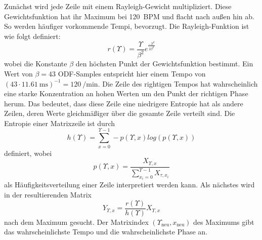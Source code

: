 {{{			%
			Zunächst wird jede Zeile mit einem Rayleigh-Gewicht multipliziert.
			Diese Gewichtsfunktion hat ihr Maximum bei \SI{120}{BPM} und flacht nach außen hin ab.
			So werden häufiger vorkommende Tempi, bevorzugt.
			Die Rayleigh-Funktion ist wie folgt definiert:
			\begin{equation}
				r(\Upsilon) = \frac{\Upsilon}{\beta^2}e^{\frac{-\Upsilon^2}{2\beta^2}}
			\end{equation}
			wobei die Konstante $\beta$ den höchsten Punkt der Gewichtsfunktion bestimmt.
			Ein Wert von $\beta = 43$ ODF-Samples entspricht hier einem Tempo von
				$(43 \cdot \SI{11.61}{\milli\second})^{-1} = \SI{120}{\per\minute}$.
			Die Zeile des rightigen Tempos hat wahrscheinlich eine starke Konzentration an hohen Werten um den Punkt der richtigen Phase herum.
			Das bedeutet,
				dass diese Zeile eine niedrigere Entropie hat als andere Zeilen,
				deren Werte gleichmäßiger über die gesamte Zeile verteilt sind.
			Die Entropie einer Matrixzeile ist durch
				\begin{equation}
					h(\Upsilon) = \sum_{x = 0}^{\Upsilon - 1} -p(\Upsilon, x) log(p(\Upsilon, x))
				\end{equation}
				definiert, wobei
				\begin{equation}
					p(\Upsilon, x) = \frac{X_{\Upsilon, x}}{\sum_{x_i = 0}^{\Upsilon - 1}X_{\tau, x_i}}
				\end{equation}
				als Häufigkeitsverteilung einer Zeile interpretiert werden kann.
			Als nächstes wird in der resultierenden Matrix
				\begin{equation}
					Y_{\Upsilon, x} = \frac{r(\Upsilon)}{h(\Upsilon)}X_{\Upsilon, x}
				\end{equation}
				nach dem Maximum gesucht.
			Der Matrixindex $(\Upsilon_{\text{neu}}, x_{\text{neu}})$ des Maximums gibt das wahrscheinlichste Tempo und die wahrscheinlichste Phase an.

}}}
